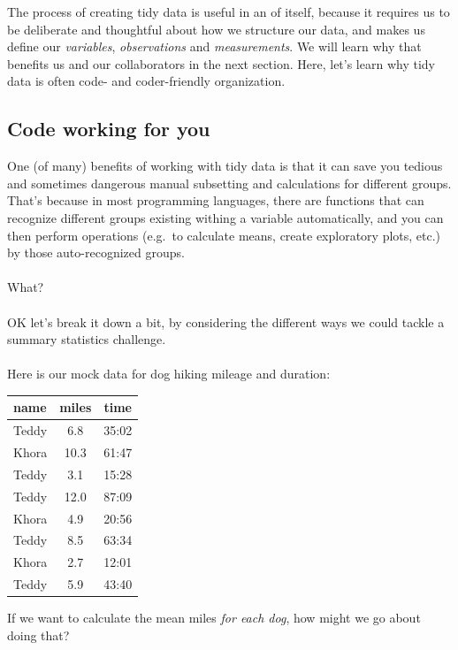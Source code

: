 \documentclass[
]{book}
\begin{document}
The process of creating tidy data is useful in an of itself, because it requires us to be deliberate and thoughtful about how we structure our data, and makes us define our \emph{variables}, \emph{observations} and \emph{measurements}. We will learn why that benefits us and our collaborators in the next section. Here, let's learn why tidy data is often code- and coder-friendly organization.

\hypertarget{code-working-for-you}{%
\subsection{Code working for you}\label{code-working-for-you}}

One (of many) benefits of working with tidy data is that it can save you tedious and sometimes dangerous manual subsetting and calculations for different groups. That's because in most programming languages, there are functions that can recognize different groups existing withing a variable automatically, and you can then perform operations (e.g.~to calculate means, create exploratory plots, etc.) by those auto-recognized groups.\\
~\\
What?\\
~\\
OK let's break it down a bit, by considering the different ways we could tackle a summary statistics challenge.\\
~\\
Here is our mock data for dog hiking mileage and duration:

\begin{longtable}[]{@{}lcc@{}}
\toprule
name & miles & time \\
\midrule
\endhead
Teddy & 6.8 & 35:02 \\
Khora & 10.3 & 61:47 \\
Teddy & 3.1 & 15:28 \\
Teddy & 12.0 & 87:09 \\
Khora & 4.9 & 20:56 \\
Teddy & 8.5 & 63:34 \\
Khora & 2.7 & 12:01 \\
Teddy & 5.9 & 43:40 \\
\bottomrule
\end{longtable}

If we want to calculate the mean miles \emph{for each dog}, how might we go about doing that?
\end{document}
